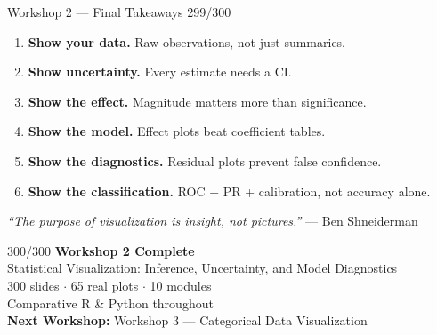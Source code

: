 \documentclass[10pt]{beamer}
\newcommand{\smark}[1]{\hfill{\scriptsize\color{codegray}#1}}
\begin{document}
\begin{frame}{Workshop 2 --- Final Takeaways}
\smark{299/300}
\begin{enumerate}
    \item \textbf{Show your data.} Raw observations, not just summaries.
    \item \textbf{Show uncertainty.} Every estimate needs a CI.
    \item \textbf{Show the effect.} Magnitude matters more than significance.
    \item \textbf{Show the model.} Effect plots beat coefficient tables.
    \item \textbf{Show the diagnostics.} Residual plots prevent false confidence.
    \item \textbf{Show the classification.} ROC + PR + calibration, not accuracy alone.
\end{enumerate}

\vspace{0.3cm}
\centering
\textit{``The purpose of visualization is insight, not pictures.''} --- Ben Shneiderman
\end{frame}

\begin{frame}{}\smark{300/300}
\centering\vspace{1.5cm}
{\Huge\textbf{Workshop 2 Complete}}\\[0.8cm]
{\Large Statistical Visualization: Inference, Uncertainty, and Model Diagnostics}\\[0.5cm]
300 slides $\cdot$ 65 real plots $\cdot$ 10 modules\\[0.3cm]
Comparative R \& Python throughout\\[0.8cm]
\textbf{Next Workshop:} Workshop 3 --- Categorical Data Visualization
\end{frame}
\end{document}
